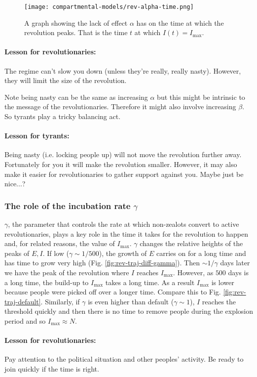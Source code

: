\begin{figure}[h!]
	\centering
	\texttt{[image: compartmental-models/rev-alpha-time.png]}
	\caption{A graph showing the lack of effect $\alpha$ has on the time at which the revolution peaks. That is the time $t$ at which $I(t)=I_{\max}$.}
	\label{fig:rev-alpha-time}
\end{figure}
\begin{tcolorbox}
	\paragraph{Lesson for revolutionaries:} The regime can't slow you down (unless they're really, really nasty). However, they will limit the size of the revolution.
\end{tcolorbox}
Note being nasty can be the same as increasing $\alpha$ but this might be intrinsic to the message of the revolutionaries. Therefore it might also involve increasing $\beta$. So tyrants play a tricky balancing act.
\begin{tcolorbox}[colback=removed-colour!30]
	\paragraph{Lesson for tyrants:} Being nasty (i.e. locking people up) will not move the revolution further away. Fortunately for you it will make the revolution smaller. However, it may also make it easier for revolutionaries to gather support against you. Maybe just be nice...?
\end{tcolorbox}
\subsubsection{The role of the incubation rate $\gamma$}
$\gamma$, the parameter that controls the rate at which non-zealots convert to active revolutionaries, plays a key role in the time it takes for the revolution to happen and, for related reasons, the value of $I_{\max}$. $\gamma$ changes the relative heights of the peaks of $E,I$. If low ($\gamma\sim 1/500$), the growth of $E$ carries on for a long time and has time to grow very high (Fig. \ref{fig:rev-traj-diff-gamma}). Then $\sim1/\gamma$ days later we have the peak of the revolution where $I$ reaches $I_{\max}$. However, as $500$ days is a long time, the build-up to $I_{\max}$ takes a long time. As a result $I_{\max}$ is lower because people were picked off over a longer time. Compare this to Fig. \ref{fig:rev-traj-default}. Similarly, if $\gamma$ is even higher than default ($\gamma\sim1$), $I$ reaches the threshold quickly and then there is no time to remove people during the explosion period and so $I_{\max}\approx N$.
\begin{tcolorbox}
	\paragraph{Lesson for revolutionaries:} Pay attention to the political situation and other peoples' activity. Be ready to join quickly if the time is right.
\end{tcolorbox}
